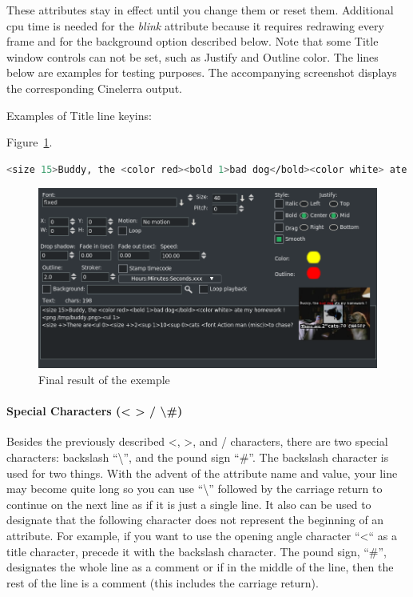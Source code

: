 {These attributes stay in effect until you change them or reset them. Additional cpu time is needed for the \textit{blink} attribute because it requires redrawing every frame and for the background option described below. Note that some Title window controls can not be set, such as Justify and Outline color. The lines below are examples for testing purposes. The accompanying screenshot displays the corresponding Cinelerra output.

\vspace{1ex} Examples of Title line keyins:

Figure~\ref{fig:title03}.

\vspace{1ex}
\begin{lstlisting}[language=Bash,numbers=none]
<size 15>Buddy, the <color red><bold 1>bad dog</bold><color white> ate my homework !<png /tmp/buddy.png><ul 1><size +>There are<ul 0><size +>2<sup 1>10<sup 0>cats <font Action man (misc)>to chase?
\end{lstlisting}

\begin{figure}[hbtp]
    \centering
    \includegraphics[width=0.9\linewidth]{images/title03.png}
    \caption{Final result of the exemple}
    \label{fig:title03}
\end{figure}

\paragraph{Special Characters (< > / \textbackslash \#)} Besides the previously described <, >, and / characters, there are two special characters: backslash “\textbackslash”, and the pound sign “\#”. The backslash character is used for two things. With the advent of the attribute name and value, your line may become quite long so you can use “\textbackslash” followed by the carriage return to continue on the next line as if it is just a single line. It also can be used to designate that the following character does not represent the beginning of an attribute. For example, if you want to use the opening angle character “<“ as a title character, precede it with the backslash character. The pound sign, “\#”, designates the whole line as a comment or if in the middle of the line, then the rest of the line is a comment (this includes the carriage return).

}
